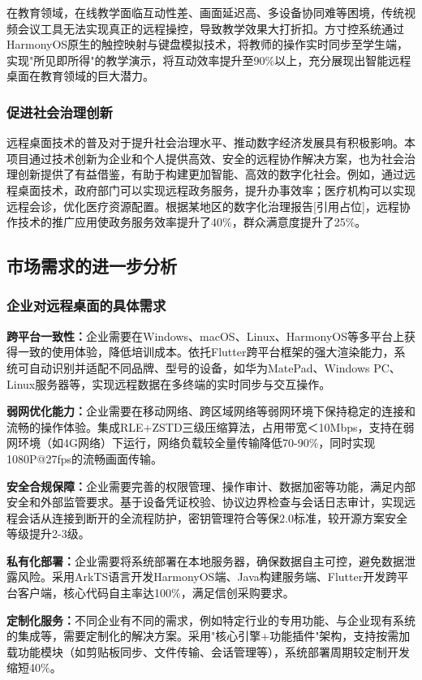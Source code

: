 \documentclass[12pt,a4paper]{article}
\renewcommand{\cite}[1]{[引用占位]}
\begin{document}
在教育领域，在线教学面临互动性差、画面延迟高、多设备协同难等困境，传统视频会议工具无法实现真正的远程操控，导致教学效果大打折扣。方寸控系统通过HarmonyOS原生的触控映射与键盘模拟技术，将教师的操作实时同步至学生端，实现"所见即所得"的教学演示，将互动效率提升至90\%以上，充分展现出智能远程桌面在教育领域的巨大潜力。

\subsubsection{促进社会治理创新}
远程桌面技术的普及对于提升社会治理水平、推动数字经济发展具有积极影响。本项目通过技术创新为企业和个人提供高效、安全的远程协作解决方案，也为社会治理创新提供了有益借鉴，有助于构建更加智能、高效的数字化社会。例如，通过远程桌面技术，政府部门可以实现远程政务服务，提升办事效率；医疗机构可以实现远程会诊，优化医疗资源配置。根据某地区的数字化治理报告\cite{report2023governance}，远程协作技术的推广应用使政务服务效率提升了40\%，群众满意度提升了25\%。

\subsection{市场需求的进一步分析}

\subsubsection{企业对远程桌面的具体需求}
\textbf{跨平台一致性：}企业需要在Windows、macOS、Linux、HarmonyOS等多平台上获得一致的使用体验，降低培训成本。依托Flutter跨平台框架的强大渲染能力，系统可自动识别并适配不同品牌、型号的设备，如华为MatePad、Windows PC、Linux服务器等，实现远程数据在多终端的实时同步与交互操作。

\textbf{弱网优化能力：}企业需要在移动网络、跨区域网络等弱网环境下保持稳定的连接和流畅的操作体验。集成RLE+ZSTD三级压缩算法，占用带宽＜10Mbps，支持在弱网环境（如4G网络）下运行，网络负载较全量传输降低70-90\%，同时实现1080P@27fps的流畅画面传输。

\textbf{安全合规保障：}企业需要完善的权限管理、操作审计、数据加密等功能，满足内部安全和外部监管要求。基于设备凭证校验、协议边界检查与会话日志审计，实现远程会话从连接到断开的全流程防护，密钥管理符合等保2.0标准，较开源方案安全等级提升2-3级。

\textbf{私有化部署：}企业需要将系统部署在本地服务器，确保数据自主可控，避免数据泄露风险。采用ArkTS语言开发HarmonyOS端、Java构建服务端、Flutter开发跨平台客户端，核心代码自主率达100\%，满足信创采购要求。

\textbf{定制化服务：}不同企业有不同的需求，例如特定行业的专用功能、与企业现有系统的集成等，需要定制化的解决方案。采用"核心引擎+功能插件"架构，支持按需加载功能模块（如剪贴板同步、文件传输、会话管理等），系统部署周期较定制开发缩短40\%。
\end{document}
